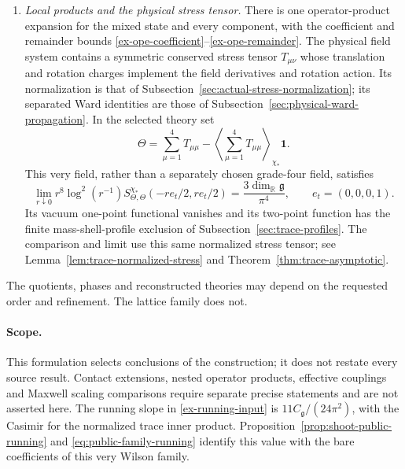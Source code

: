 \begin{theorem}
\begin{enumerate}
\item \emph{Local products and the physical stress tensor.}
There is one operator-product expansion for the mixed state and every
component, with the coefficient and remainder bounds
\eqref{ex-ope-coefficient}--\eqref{ex-ope-remainder}. The physical field
system contains a symmetric conserved stress tensor $T_{\mu\nu}$ whose
translation and rotation charges implement the field derivatives and
rotation action. Its normalization is that of
Subsection~\ref{sec:actual-stress-normalization}; its separated Ward identities
are those of Subsection~\ref{sec:physical-ward-propagation}.
In the selected theory set
\[
 \Theta=\sum_{\mu=1}^4T_{\mu\mu}
       -\left\langle\sum_{\mu=1}^4T_{\mu\mu}\right\rangle_{\chi_*}\mathbf1 .
\]
This very field, rather than a separately chosen grade-four field, satisfies
\[
 \lim_{r\downarrow0}r^8\log^2(r^{-1})
 S^{\chi_*}_{\Theta,\Theta}(-re_t/2,re_t/2)
       =\frac{3\dim_{\mathbb R}\mathfrak g}{\pi^4},
 \qquad e_t=(0,0,0,1).
\]
Its vacuum one-point functional vanishes and its two-point function has
the finite mass-shell-profile exclusion of
Subsection~\ref{sec:trace-profiles}. The comparison and limit use this same
normalized stress tensor; see Lemma~\ref{lem:trace-normalized-stress}
and Theorem~\ref{thm:trace-asymptotic}.
\end{enumerate}
The quotients, phases and reconstructed theories may depend on the
requested order and refinement. The lattice family does not.
\end{theorem}

\paragraph{Scope.}
This formulation selects conclusions of the construction; it does not
restate every source result. Contact extensions, nested operator products,
effective couplings and Maxwell scaling comparisons require separate precise
statements and are not asserted here. The running slope in
\eqref{ex-running-input} is $11C_{\mathfrak g}/(24\pi^2)$, with the
Casimir for the normalized trace inner product. Proposition~\ref{prop:shoot-public-running}
and \eqref{eq:public-family-running} identify this value with the bare
coefficients of this very Wilson family.

